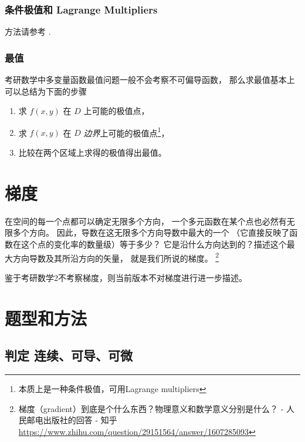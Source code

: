 \subsubsection{条件极值和 Lagrange Multipliers}
\label{conditional-extrema-and-lagrange-multipliers}

方法请参考 \cite[page 174, pdf 185]{we}.

\subsubsection{最值}

考研数学中多变量函数最值问题一般不会考察不可偏导函数，
那么求最值基本上可以总结为下面的步骤
\begin{enumerate}
    \item 求 $f(x, y)$ 在 $D$ 上可能的极值点，
    \item 求 $f(x, y)$ 在 $D$ \emph{边界}上可能的极值点\footnote{本质上是一种条件极值，可用Lagrange multipliers}，
    \item 比较在两个区域上求得的极值得出最值。
\end{enumerate}

\section{梯度}\label{gradient}

在空间的每一个点都可以确定无限多个方向，
一个多元函数在某个点也必然有无限多个方向。
因此，导数在这无限多个方向导数中最大的一个
（它直接反映了函数在这个点的变化率的数量级）等于多少？
它是沿什么方向达到的？描述这个最大方向导数及其所沿方向的矢量，
就是我们所说的梯度。
\footnote{
    梯度（gradient）到底是个什么东西？物理意义和数学意义分别是什么？ 
    - 人民邮电出版社的回答 - 知乎
    \url{https://www.zhihu.com/question/29151564/answer/1607285093}
}

鉴于考研数学2不考察梯度，则当前版本不对梯度进行进一步描述。

\section{题型和方法}

\subsection{判定 连续、可导、可微}

